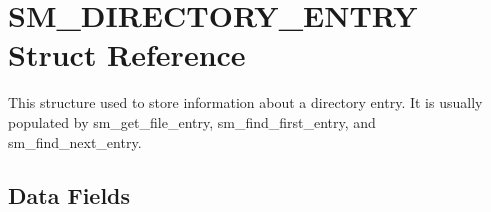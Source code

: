 \hypertarget{struct_s_m___d_i_r_e_c_t_o_r_y___e_n_t_r_y}{\section{S\-M\-\_\-\-D\-I\-R\-E\-C\-T\-O\-R\-Y\-\_\-\-E\-N\-T\-R\-Y Struct Reference}
\label{struct_s_m___d_i_r_e_c_t_o_r_y___e_n_t_r_y}
}


This structure used to store information about a directory entry. It is usually populated by sm\-\_\-get\-\_\-file\-\_\-entry, sm\-\_\-find\-\_\-first\-\_\-entry, and sm\-\_\-find\-\_\-next\-\_\-entry.  


\subsection*{Data Fields}

